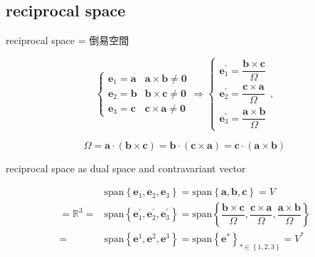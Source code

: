 \documentclass[
]{book}
\theoremstyle{definition}
\theoremstyle{definition}
\theoremstyle{definition}
\theoremstyle{definition}
\theoremstyle{remark}
\begin{document}
\hypertarget{reciprocal-space}{%
\subsection{reciprocal space}\label{reciprocal-space}}

\begin{CJK}{UTF8}{bsmi}
reciprocal space = 倒易空間
\end{CJK}

\[
\begin{cases}
\boldsymbol{e}_{{\scriptscriptstyle 1}}=\boldsymbol{a} & \boldsymbol{a}\times\boldsymbol{b}\ne\boldsymbol{0}\\
\boldsymbol{e}_{{\scriptscriptstyle 2}}=\boldsymbol{b} & \boldsymbol{b}\times\boldsymbol{c}\ne\boldsymbol{0}\\
\boldsymbol{e}_{{\scriptscriptstyle 3}}=\boldsymbol{c} & \boldsymbol{c}\times\boldsymbol{a}\ne\boldsymbol{0}
\end{cases}\Rightarrow\begin{cases}
\boldsymbol{e}_{{\scriptscriptstyle 1}}^{\prime}=\dfrac{\boldsymbol{b}\times\boldsymbol{c}}{\Omega}\\
\boldsymbol{e}_{{\scriptscriptstyle 2}}^{\prime}=\dfrac{\boldsymbol{c}\times\boldsymbol{a}}{\Omega}\\
\boldsymbol{e}_{{\scriptscriptstyle 3}}^{\prime}=\dfrac{\boldsymbol{a}\times\boldsymbol{b}}{\Omega}
\end{cases},
\]

\[
\Omega=\boldsymbol{a}\cdot\left(\boldsymbol{b}\times\boldsymbol{c}\right)=\boldsymbol{b}\cdot\left(\boldsymbol{c}\times\boldsymbol{a}\right)=\boldsymbol{c}\cdot\left(\boldsymbol{a}\times\boldsymbol{b}\right)
\]

reciprocal space as dual space and contravariant vector

\[
\begin{aligned}
 & \mathrm{span}\left\{ \boldsymbol{e}_{{\scriptscriptstyle 1}},\boldsymbol{e}_{{\scriptscriptstyle 2}},\boldsymbol{e}_{{\scriptscriptstyle 3}}\right\} =\mathrm{span}\left\{ \boldsymbol{a},\boldsymbol{b},\boldsymbol{c}\right\} =V\\
=\mathbb{R}^{3}= & \mathrm{span}\left\{ \boldsymbol{e}_{{\scriptscriptstyle 1}}^{\prime},\boldsymbol{e}_{{\scriptscriptstyle 2}}^{\prime},\boldsymbol{e}_{{\scriptscriptstyle 3}}^{\prime}\right\} =\mathrm{span}\left\{ \dfrac{\boldsymbol{b}\times\boldsymbol{c}}{\Omega},\dfrac{\boldsymbol{c}\times\boldsymbol{a}}{\Omega},\dfrac{\boldsymbol{a}\times\boldsymbol{b}}{\Omega}\right\} \\
= & \mathrm{span}\left\{ \boldsymbol{e}^{{\scriptscriptstyle 1}},\boldsymbol{e}^{{\scriptscriptstyle 2}},\boldsymbol{e}^{{\scriptscriptstyle 3}}\right\} =\mathrm{span}\left\{ \boldsymbol{e}^{{\scriptscriptstyle *}}\right\} _{{\scriptscriptstyle *\in\left\{ 1,2,3\right\} }}=V^{*}
\end{aligned}
\]
\end{document}
